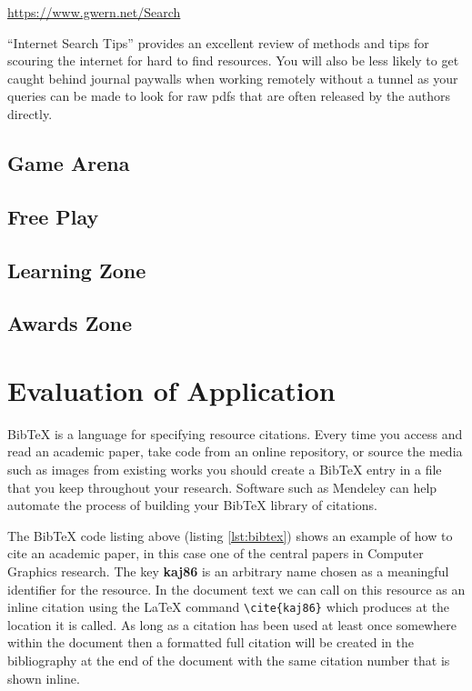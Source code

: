 		\begin{center}
		{\small \url{https://www.gwern.net/Search}}
		\end{center}
		
		``Internet Search Tips'' \cite{gwern} provides an excellent review of methods and tips for scouring the internet for hard to find resources. You will also be less likely to get caught behind journal paywalls when working remotely without a tunnel as your queries can be made to look for raw pdfs that are often released by the authors directly.
		
	\subsection{Game Arena}
	\subsection{Free Play}
	\subsection{Learning Zone}
	\subsection{Awards Zone}
			
	\section{Evaluation of Application}
		\label{sec:app_evaluation}
	
		BibTeX is a language for specifying resource citations. Every time you access and read an academic paper, take code from an online repository, or source the media such as images from existing works you should create a BibTeX entry in a file that you keep throughout your research. Software such as Mendeley \cite{mendeley} can help automate the process of building your BibTeX library of citations. 
		
		
		
		The BibTeX code listing above (listing \ref{lst:bibtex}) shows an example of how to cite an academic paper, in this case one of the central papers in Computer Graphics research. The key \textbf{kaj86} is an arbitrary name chosen as a meaningful identifier for the resource. In the document text we can call on this resource as an inline citation using the LaTeX command \lstinline|\cite{kaj86}| which produces \cite{kaj86} at the location it is called. As long as a citation has been used at least once somewhere within the document then a formatted full citation will be created in the bibliography at the end of the document with the same citation number that is shown inline.
		
